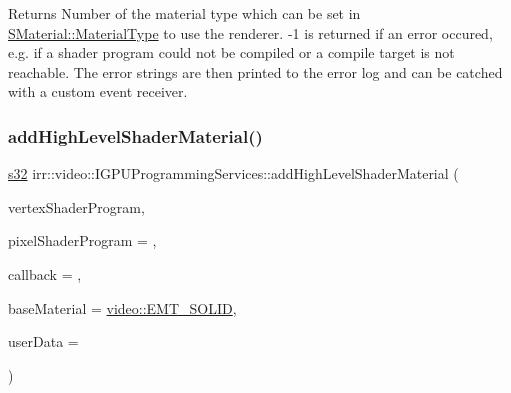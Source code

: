 \begin{DoxyReturn}{Returns}
Number of the material type which can be set in \hyperlink{classirr_1_1video_1_1SMaterial_a8cb63ab4b49ae1c61fbca8353e6b2f8a}{S\+Material\+::\+Material\+Type} to use the renderer. -\/1 is returned if an error occured, e.\+g. if a shader program could not be compiled or a compile target is not reachable. The error strings are then printed to the error log and can be catched with a custom event receiver. 
\end{DoxyReturn}
\mbox{\label{classirr_1_1video_1_1IGPUProgrammingServices_aeeecb11a1cab75912585b74e5329a593}} 
\subsubsection{\texorpdfstring{add\+High\+Level\+Shader\+Material()}{addHighLevelShaderMaterial()}\hspace{0.1cm}{\footnotesize\ttfamily [2/3]}}
{\footnotesize\ttfamily \hyperlink{namespaceirr_ac66849b7a6ed16e30ebede579f9b47c6}{s32} irr\+::video\+::\+I\+G\+P\+U\+Programming\+Services\+::add\+High\+Level\+Shader\+Material (\begin{DoxyParamCaption}\item[{const \hyperlink{namespaceirr_a9395eaea339bcb546b319e9c96bf7410}{c8} $\ast$}]{vertex\+Shader\+Program,  }\item[{const \hyperlink{namespaceirr_a9395eaea339bcb546b319e9c96bf7410}{c8} $\ast$}]{pixel\+Shader\+Program = {},  }\item[{\hyperlink{classirr_1_1video_1_1IShaderConstantSetCallBack}{I\+Shader\+Constant\+Set\+Call\+Back} $\ast$}]{callback = {},  }\item[{\hyperlink{namespaceirr_1_1video_ac8e9b6c66f7cebabd1a6d30cbc5430f1}{E\+\_\+\+M\+A\+T\+E\+R\+I\+A\+L\+\_\+\+T\+Y\+PE}}]{base\+Material = {\ttfamily \hyperlink{namespaceirr_1_1video_ac8e9b6c66f7cebabd1a6d30cbc5430f1a9bc471b9c18c9e2d20496004d2a2e803}{video\+::\+E\+M\+T\+\_\+\+S\+O\+L\+ID}},  }\item[{\hyperlink{namespaceirr_ac66849b7a6ed16e30ebede579f9b47c6}{s32}}]{user\+Data = {} }\end{DoxyParamCaption})\hspace{0.3cm}{\ttfamily [inline]}}



